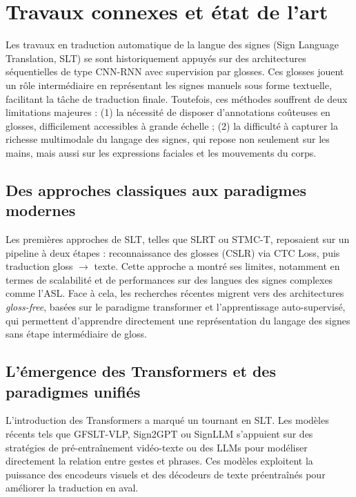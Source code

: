 \section*{Travaux connexes et état de l'art}

Les travaux en traduction automatique de la langue des signes (Sign Language Translation, SLT) se sont historiquement appuyés sur des architectures séquentielles de type CNN-RNN avec supervision par glosses. Ces glosses jouent un rôle intermédiaire en représentant les signes manuels sous forme textuelle, facilitant la tâche de traduction finale. Toutefois, ces méthodes souffrent de deux limitations majeures : (1) la nécessité de disposer d’annotations coûteuses en glosses, difficilement accessibles à grande échelle ; (2) la difficulté à capturer la richesse multimodale du langage des signes, qui repose non seulement sur les mains, mais aussi sur les expressions faciales et les mouvements du corps.

\subsection*{Des approches classiques aux paradigmes modernes}

Les premières approches de SLT, telles que SLRT ou STMC-T, reposaient sur un pipeline à deux étapes : reconnaissance des glosses (CSLR) via CTC Loss, puis traduction gloss $\rightarrow$ texte. Cette approche a montré ses limites, notamment en termes de scalabilité et de performances sur des langues des signes complexes comme l’ASL. Face à cela, les recherches récentes migrent vers des architectures \textit{gloss-free}, basées sur le paradigme transformer et l’apprentissage auto-supervisé, qui permettent d'apprendre directement une représentation du langage des signes sans étape intermédiaire de gloss.

\subsection*{L’émergence des Transformers et des paradigmes unifiés}

L’introduction des Transformers a marqué un tournant en SLT. Les modèles récents tels que GFSLT-VLP, Sign2GPT ou SignLLM s’appuient sur des stratégies de pré-entraînement vidéo-texte ou des LLMs pour modéliser directement la relation entre gestes et phrases. Ces modèles exploitent la puissance des encodeurs visuels et des décodeurs de texte préentraînés pour améliorer la traduction en aval.


